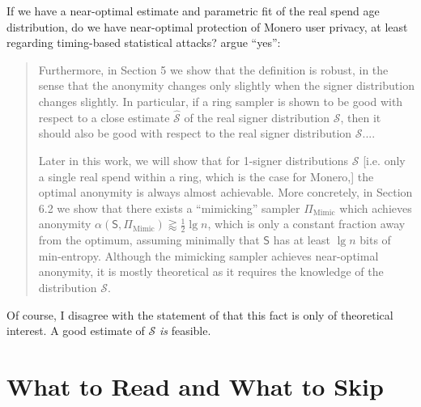 \documentclass[english]{article}
\begin{document}
If we have a near-optimal estimate and parametric fit of the real
spend age distribution, do we have near-optimal protection of Monero
user privacy, at least regarding timing-based statistical attacks?
\cite{Ronge2021} argue ``yes'':
\begin{quote}
Furthermore, in Section 5 we show that the definition is robust, in
the sense that the anonymity changes only slightly when the signer
distribution changes slightly. In particular, if a ring sampler is
shown to be good with respect to a close estimate $\hat{\mathcal{S}}$
of the real signer distribution $\mathcal{S}$, then it should also
be good with respect to the real signer distribution $\mathcal{S}$....

Later in this work, we will show that for 1-signer distributions $\mathcal{S}$
{[}i.e. only a single real spend within a ring, which is the case
for Monero,{]} the optimal anonymity is always almost achievable.
More concretely, in Section 6.2 we show that there exists a \textquotedblleft mimicking\textquotedblright{}
sampler $\Pi_{\mathrm{Mimic}}$ which achieves anonymity $\alpha\left(\mathsf{S},\Pi_{\mathrm{Mimic}}\right)\gtrapprox\tfrac{1}{2}\lg n$,
which is only a constant fraction away from the optimum, assuming
minimally that $\mathsf{S}$ has at least $\lg n$ bits of min-entropy.
Although the mimicking sampler achieves near-optimal anonymity, it
is mostly theoretical as it requires the knowledge of the distribution
$\mathcal{S}$.
\end{quote}
Of course, I disagree with the statement of \cite{Ronge2021} that
this fact is only of theoretical interest. A good estimate of $\mathcal{S}$
\textit{is} feasible.

\section{What to Read and What to Skip}
\end{document}
